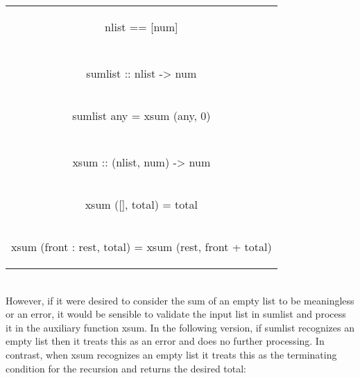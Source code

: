 \documentclass[11pt]{article}
\begin{document}
\begin{tabular}{ |c| } 
 \hline
\begin{flushleft} nlist == [num] \end{flushleft}\\
\\
\begin{flushleft}sumlist :: nlist -> num\end{flushleft}\\
\begin{flushleft}sumlist any = xsum (any, 0)\end{flushleft}\\
\\
\begin{flushleft}xsum :: (nlist, num) -> num\end{flushleft}\\
\begin{flushleft}xsum ([], total) = total\end{flushleft}\\
\begin{flushleft}xsum (front : rest, total) = xsum (rest, front + total)\end{flushleft}\\
\hline
\end{tabular}
\\


However, if it were desired to consider the sum of an empty 
list to be meaningless or an error, it would be sensible to 
validate the input list in sumlist and process
it in the auxiliary function xsum. In the following version, 
if sumlist recognizes an empty list then it treats this as an 
error and does no further processing. In contrast,
when xsum recognizes an empty list it treats this as the 
terminating condition for the recursion and returns the desired total:
\end{document}
